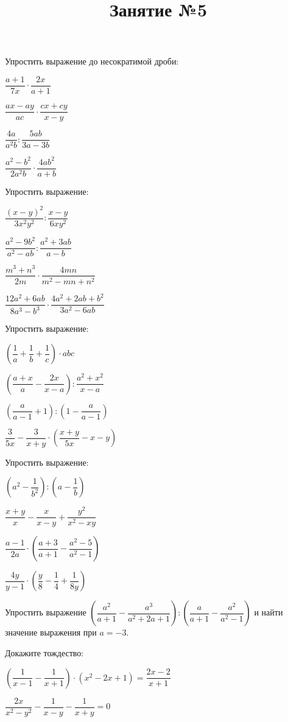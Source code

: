 \newpage
\title{Занятие №5}
\begin{listofex}
	\item Упростить выражение до несократимой дроби:
	\begin{enumcols}[itemcolumns=4]
		\item \( \dfrac{a+1}{7x}\cdot\dfrac{2x}{a+1} \)
		\item \( \dfrac{ax-ay}{ac}\cdot\dfrac{cx+cy}{x-y} \)
		\item \( \dfrac{4a}{a^2b}:\dfrac{5ab}{3a-3b} \)
		\item \( \dfrac{a^2-b^2}{2a^2b}\cdot\dfrac{4ab^2}{a+b} \)
	\end{enumcols}
	\item Упростить выражение:
	\begin{enumcols}[itemcolumns=3]
		\item \( \dfrac{(x-y)^2}{3x^2y^2}:\dfrac{x-y}{6xy^2} \)
		\item \( \dfrac{a^2-9b^2}{a^2-ab}:\dfrac{a^2+3ab}{a-b} \)
		\item \( \dfrac{m^3+n^3}{2m}\cdot\dfrac{4mn}{m^2-mn+n^2} \)
		\item \( \dfrac{12a^2+6ab}{8a^3-b^3}\cdot\dfrac{4a^2+2ab+b^2}{3a^2-6ab} \)
	\end{enumcols}
	\item Упростить выражение:
	\begin{enumcols}[itemcolumns=2]
		\item \( \left( \dfrac{1}{a}+\dfrac{1}{b}+\dfrac{1}{c} \right)\cdot abc \)
		\item \( \left( \dfrac{a+x}{a}-\dfrac{2x}{x-a} \right):\dfrac{a^2+x^2}{x-a} \)
		\item \( \left( \dfrac{a}{a-1}+1 \right):\left( 1-\dfrac{a}{a-1} \right) \)
		\item \( \dfrac{3}{5x}-\dfrac{3}{x+y}\cdot\left( \dfrac{x+y}{5x}-x-y \right) \)
	\end{enumcols}
	\item Упростить выражение:
	\begin{enumcols}[itemcolumns=2]
		\item \( \left( a^2-\dfrac{1}{b^2} \right):\left( a-\dfrac{1}{b} \right) \)
		\item \( \dfrac{x+y}{x}-\dfrac{x}{x-y}+\dfrac{y^2}{x^2-xy} \)
		\item \( \dfrac{a-1}{2a}\cdot\left( \dfrac{a+3}{a+1}-\dfrac{a^2-5}{a^2-1} \right) \)
		\item \( \dfrac{4y}{y-1}\cdot\left( \dfrac{y}{8}-\dfrac{1}{4}+\dfrac{1}{8y} \right) \)
	\end{enumcols}
	\item Упростить выражение \( \left( \dfrac{a^2}{a+1}-\dfrac{a^3}{a^2+2a+1} \right):\left( \dfrac{a}{a+1}-\dfrac{a^2}{a^2-1} \right) \) и найти значение выражения при \( a=-3 \).
	\item Докажите тождество:
	\begin{enumcols}[itemcolumns=2]
		\item \( \left( \dfrac{1}{x-1}-\dfrac{1}{x+1} \right)\cdot(x^2-2x+1)=\dfrac{2x-2}{x+1} \)
		\item \( \dfrac{2x}{x^2-y^2}-\dfrac{1}{x-y}-\dfrac{1}{x+y}=0 \)
	\end{enumcols}
\end{listofex}
